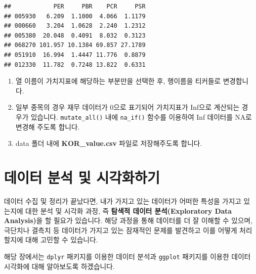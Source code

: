 \documentclass[12pt,]{book}
\newenvironment{Shaded}{\begin{snugshade}}{\end{snugshade}}
\newcommand{\KeywordTok}[1]{\textcolor[rgb]{0.13,0.29,0.53}{\textbf{#1}}}
\newcommand{\NormalTok}[1]{#1}
\newcommand{\OperatorTok}[1]{\textcolor[rgb]{0.81,0.36,0.00}{\textbf{#1}}}
\newcommand{\OtherTok}[1]{\textcolor[rgb]{0.56,0.35,0.01}{#1}}
\newcommand{\StringTok}[1]{\textcolor[rgb]{0.31,0.60,0.02}{#1}}
\providecommand{\tightlist}{%
  \setlength{\itemsep}{0pt}\setlength{\parskip}{0pt}}
\begin{document}
\begin{verbatim}
##            PER     PBR    PCR     PSR
## 005930   6.209  1.1000  4.066  1.1179
## 000660   3.204  1.0628  2.240  1.2312
## 005380  20.048  0.4091  8.032  0.3123
## 068270 101.957 10.1384 69.857 27.1789
## 051910  16.994  1.4447 11.776  0.8879
## 012330  11.782  0.7248 13.822  0.6331
\end{verbatim}

\begin{Shaded}
\end{Shaded}

\begin{enumerate}
\def\labelenumi{\arabic{enumi}.}
\tightlist
\item
  열 이름이 가치지표에 해당하는 부분만을 선택한 후, 행이름을 티커들로 변경합니다.
\item
  일부 종목의 경우 재무 데이터가 0으로 표기되어 가치지표가 Inf으로 계산되는 경우가 있습니다. \texttt{mutate\_all()} 내에 \texttt{na\_if()} 함수를 이용하여 Inf 데이터를 NA로 변경해 주도록 합니다.
\item
  data 폴더 내에 \textbf{KOR\_value.csv} 파일로 저장해주도록 합니다.
\end{enumerate}

\hypertarget{section-38}{%
\chapter{데이터 분석 및 시각화하기}\label{section-38}}

데이터 수집 및 정리가 끝났다면, 내가 가지고 있는 데이터가 어떠한 특성을 가지고 있는지에 대한 분석 및 시각화 과정, 즉 \textbf{탐색적 데이터 분석(Exploratory Data Analysis)}을 할 필요가 있습니다. 해당 과정을 통해 데이터를 더 잘 이해할 수 있으며, 극단치나 결측치 등 데이터가 가지고 있는 잠재적인 문제를 발견하고 이를 어떻게 처리할지에 대해 고민할 수 있습니다.

해당 장에서는 \texttt{dplyr} 패키지를 이용한 데이터 분석과 \texttt{ggplot} 패키지를 이용한 데이터 시각화에 대해 알아보도록 하겠습니다.
\end{document}
